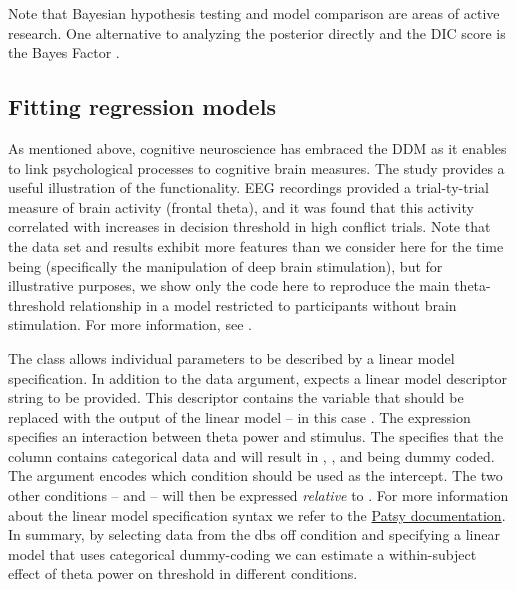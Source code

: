 \documentclass[letterpaper,10pt,english]{article}
\begin{document}
Note that Bayesian hypothesis testing and model comparison are areas
of active research.  One alternative to analyzing the posterior
directly and the DIC score is the Bayes Factor
\citep[e.g.][]{WagenmakersLodewyckxKuriyalEtAl10}.

\subsection*{Fitting regression models}
\label{demo:fitting-regression-models}
As mentioned above, cognitive neuroscience has embraced the DDM as it
enables to link psychological processes to cognitive brain measures.
The \citet{CavanaghWieckiCohenEtAl11} study provides a useful
illustration of the functionality. EEG recordings provided a
trial-ty-trial measure of brain activity (frontal theta), and it was
found that this activity correlated with increases in decision
threshold in high conflict trials. Note that the data set and results
exhibit more features than we consider here for the time being
(specifically the manipulation of deep brain stimulation), but for
illustrative purposes, we show only the code here to reproduce the main theta-threshold relationship in a model restricted to participants without brain stimulation. For more information, see
\citet{CavanaghWieckiCohenEtAl11}.

The  class allows individual parameters to be described by a linear model specification. In addition to the data argument,  expects a linear model descriptor string to be provided. This descriptor contains the  variable that should be replaced with the output of the linear model -- in this case . The expression  specifies an interaction between theta power and stimulus. The  specifies that the  column contains categorical data and will result in , , and  being dummy coded. The  argument encodes which condition should be used as the intercept. The two other conditions --  and  -- will then be expressed \textit{relative} to . For more information about the linear model specification syntax we refer to the \href{http://patsy.readthedocs.org/en/latest/}{Patsy documentation}. In summary, by selecting data from the dbs off condition and specifying a linear model that uses categorical dummy-coding we can estimate a within-subject effect of theta power on threshold in different conditions.

\end{document}
